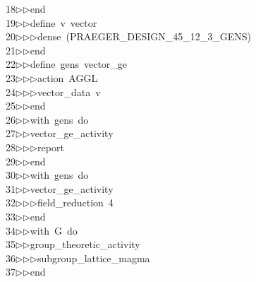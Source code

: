 \begin{tabbing}
18\>$\triangleright$\>$\triangleright$\>end\ \\[0pt]
19\>$\triangleright$\>$\triangleright$\>define\ v\ vector\ \\[0pt]
20\>$\triangleright$\>$\triangleright$\>$\triangleright$\>dense\ (PRAEGER\_DESIGN\_45\_12\_3\_GENS)\ \\[0pt]
21\>$\triangleright$\>$\triangleright$\>end\ \\[0pt]
22\>$\triangleright$\>$\triangleright$\>define\ gens\ vector\_ge\ \\[0pt]
23\>$\triangleright$\>$\triangleright$\>$\triangleright$\>action\ AGGL\ \\[0pt]
24\>$\triangleright$\>$\triangleright$\>$\triangleright$\>vector\_data\ v\ \\[0pt]
25\>$\triangleright$\>$\triangleright$\>end\ \\[0pt]
26\>$\triangleright$\>$\triangleright$\>with\ gens\ do\ \\[0pt]
27\>$\triangleright$\>$\triangleright$\>vector\_ge\_activity\ \\[0pt]
28\>$\triangleright$\>$\triangleright$\>$\triangleright$\>report\ \\[0pt]
29\>$\triangleright$\>$\triangleright$\>end\ \\[0pt]
30\>$\triangleright$\>$\triangleright$\>with\ gens\ do\ \\[0pt]
31\>$\triangleright$\>$\triangleright$\>vector\_ge\_activity\ \\[0pt]
32\>$\triangleright$\>$\triangleright$\>$\triangleright$\>field\_reduction\ 4\ \\[0pt]
33\>$\triangleright$\>$\triangleright$\>end\ \\[0pt]
34\>$\triangleright$\>$\triangleright$\>with\ G\ do\ \\[0pt]
35\>$\triangleright$\>$\triangleright$\>group\_theoretic\_activity\ \\[0pt]
36\>$\triangleright$\>$\triangleright$\>$\triangleright$\>subgroup\_lattice\_magma\ \\[0pt]
37\>$\triangleright$\>$\triangleright$\>end\ \\[0pt]

\end{tabbing}
